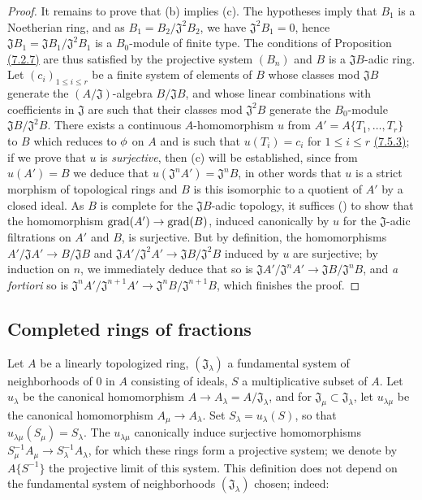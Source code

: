\begin{proof}
It remains to prove that (b) implies (c). The hypotheses imply that $B_1$ is a Noetherian ring, and
as $B_1=B_2/\mathfrak{J}^2 B_2$, we have $\mathfrak{J}^2 B_1=0$, hence
$\mathfrak{J}B_1=\mathfrak{J}B_1/\mathfrak{J}^2 B_1$ is a $B_0$-module of finite type. The
conditions of Proposition \hyperref[prop-0.7.2.7]{(7.2.7)} are thus satisfied by the projective
system $(B_n)$ and $B$ is a $\mathfrak{J}B$-adic ring. Let $(c_i)_{1\leqslant i\leqslant r}$ be a
finite system of elements of $B$ whose classes mod $\mathfrak{J}B$ generate the
$(A/\mathfrak{J})$-algebra $B/\mathfrak{J}B$, and whose linear combinations with coefficients in
$\mathfrak{J}$ are such that their classes mod $\mathfrak{J}^2 B$ generate the $B_0$-module
$\mathfrak{J}B/\mathfrak{J}^2 B$. There exists a continuous $A$-homomorphism $u$ from
$A'=A\{T_1,\dots,T_r\}$ to $B$ which reduces to $\phi$ on $A$ and is such that $u(T_i)=c_i$ for
$1\leqslant i\leqslant r$ \hyperref[env-0.7.5.3]{(7.5.3)}; if we prove that $u$ is {\em surjective},
then (c) will be established, since from $u(A')=B$ we deduce that
$u(\mathfrak{J}^n A')=\mathfrak{J}^n B$, in other words that $u$ is a strict morphism of topological
rings and $B$ is this isomorphic to a quotient of $A'$ by a closed ideal. As $B$ is complete for the
$\mathfrak{J}B$-adic topology, it suffices (\cite[p.~18--07]{I-1}) to show that the homomorphism
${\mathop{\mathrm{grad}}\nolimits}(A')\to{\mathop{\mathrm{grad}}\nolimits}(B)$, induced canonically by $u$ for the $\mathfrak{J}$-adic filtrations on
$A'$ and $B$, is surjective. But by definition, the homomorphisms
$A'/\mathfrak{J}A'\to B/\mathfrak{J}B$ and
$\mathfrak{J}A'/\mathfrak{J}^2 A'\to\mathfrak{J}B/\mathfrak{J}^2 B$ induced by $u$ are surjective;
by induction on $n$, we immediately deduce that so is
$\mathfrak{J}A'/\mathfrak{J}^n A'\to\mathfrak{J}B/\mathfrak{J}^n B$, and {\em a fortiori} so is
$\mathfrak{J}^n A'/\mathfrak{J}^{n+1}A'\to\mathfrak{J}^n B/\mathfrak{J}^{n+1}B$, which finishes the
proof.
\end{proof}

\subsection{Completed rings of fractions}
\label{subsection-completed-rings-of-fractions}

\begin{env}[7.6.1]
\label{env-0.7.6.1}
Let $A$ be a linearly topologized ring, $(\mathfrak{J}_\lambda)$ a fundamental system of
neighborhoods of $0$ in $A$ consisting of ideals, $S$ a multiplicative subset of $A$. Let
$u_\lambda$ be the canonical homomorphism $A\to A_\lambda=A/\mathfrak{J}_\lambda$, and for
$\mathfrak{J}_\mu\subset\mathfrak{J}_\lambda$, let $u_{\lambda\mu}$ be the canonical
homomorphism $A_\mu\to A_\lambda$. Set $S_\lambda=u_\lambda(S)$, so that
$u_{\lambda\mu}(S_\mu)=S_\lambda$. The $u_{\lambda\mu}$ canonically induce surjective
homomorphisms $S_\mu^{-1}A_\mu\to S_\lambda^{-1}A_\lambda$, for which these rings form a
projective system; we denote by $A\{S^{-1}\}$ the projective limit of this system. This
definition does not depend on the fundamental system of neighborhoods $(\mathfrak{J}_\lambda)$
chosen; indeed:
\end{env}

